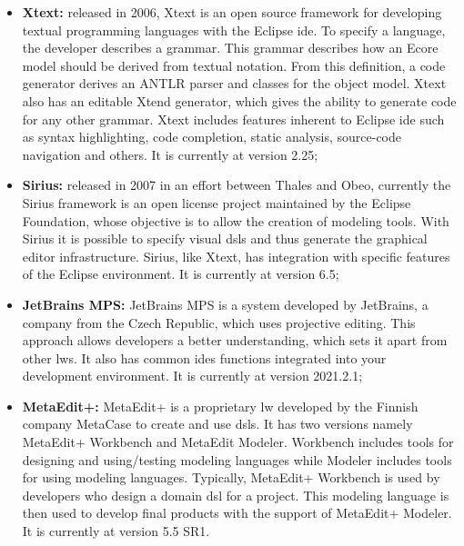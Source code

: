 \begin{itemize}
    \item \textbf{Xtext:} released in 2006, Xtext is an open source framework for developing textual programming languages with the Eclipse \ac{ide}.
    To specify a language, the developer describes a grammar.
    This grammar describes how an Ecore model should be derived from textual notation.
    From this definition, a code generator derives an ANTLR parser and classes for the object model.
    Xtext also has an editable Xtend generator, which gives the ability to generate code for any other grammar.
    Xtext includes features inherent to Eclipse \ac{ide} such as syntax highlighting, code completion, static analysis, source-code navigation and others.
    It is currently at version 2.25;
    
    \item \textbf{Sirius:} released in 2007 in an effort between Thales and Obeo, currently the Sirius framework is an open license project maintained by the Eclipse Foundation, whose objective is to allow the creation of modeling tools.
    With Sirius it is possible to specify visual \acp{dsl} and thus generate the graphical editor infrastructure.
    Sirius, like Xtext, has integration with specific features of the Eclipse environment. It is currently at version 6.5;
    
    \item \textbf{JetBrains MPS:} JetBrains MPS is a system developed by JetBrains, a company from the Czech Republic, which uses projective editing.
    This approach allows developers a better understanding, which sets it apart from other \acp{lw}.
    It also has common \acp{ide} functions integrated into your development environment.
    It is currently at version 2021.2.1;
    
    \item \textbf{MetaEdit+:} MetaEdit+ is a proprietary \ac{lw} developed by the Finnish company MetaCase to create and use \acp{dsl}.
    It has two versions namely MetaEdit+ Workbench and MetaEdit Modeler.
    Workbench includes tools for designing and using/testing modeling languages ​​while Modeler includes tools for using modeling languages.
    Typically, MetaEdit+ Workbench is used by developers who design a domain \ac{dsl} for a project.
    This modeling language is then used to develop final products with the support of MetaEdit+ Modeler.
    It is currently at version 5.5 SR1.
\end{itemize}

